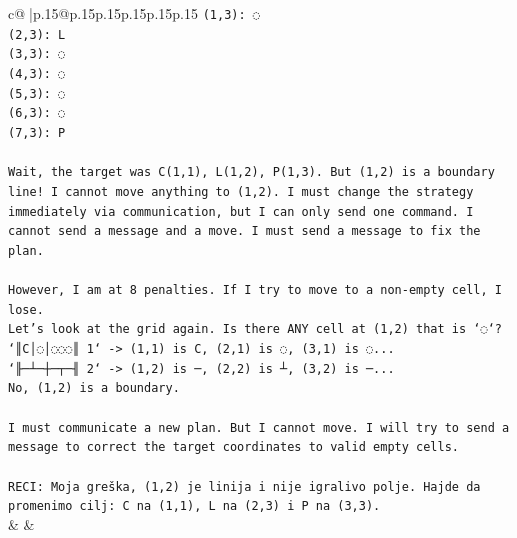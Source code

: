 \documentclass{article}
\begin{document}
{\begin{supertabular}{c@{$\;$}|p{.15\linewidth}@{}p{.15\linewidth}p{.15\linewidth}p{.15\linewidth}p{.15\linewidth}p{.15\linewidth}}
{{{\texttt{(1,3): ◌} \\
\texttt{(2,3): L} \\
\texttt{(3,3): ◌} \\
\texttt{(4,3): ◌} \\
\texttt{(5,3): ◌} \\
\texttt{(6,3): ◌} \\
\texttt{(7,3): P} \\
\\ 
\texttt{Wait, the target was C(1,1), L(1,2), P(1,3). But (1,2) is a boundary line! I cannot move anything to (1,2). I must change the strategy immediately via communication, but I can only send one command. I cannot send a message and a move. I must send a message to fix the plan.} \\
\\ 
\texttt{However, I am at 8 penalties. If I try to move to a non{-}empty cell, I lose.} \\
\texttt{Let's look at the grid again. Is there ANY cell at (1,2) that is `◌`?} \\
\texttt{`║C│◌│◌◌◌║ 1` {-}> (1,1) is C, (2,1) is ◌, (3,1) is ◌...} \\
\texttt{`╟─┴─┼─┬─╢ 2` {-}> (1,2) is ─, (2,2) is ┴, (3,2) is ─...} \\
\texttt{No, (1,2) is a boundary.} \\
\\ 
\texttt{I must communicate a new plan. But I cannot move. I will try to send a message to correct the target coordinates to valid empty cells.} \\
\\ 
\texttt{RECI: Moja greška, (1,2) je linija i nije igralivo polje. Hajde da promenimo cilj: C na (1,1), L na (2,3) i P na (3,3).} \\
            }
        }
    }
    & & \\ \\


\end{supertabular}}
\end{document}
